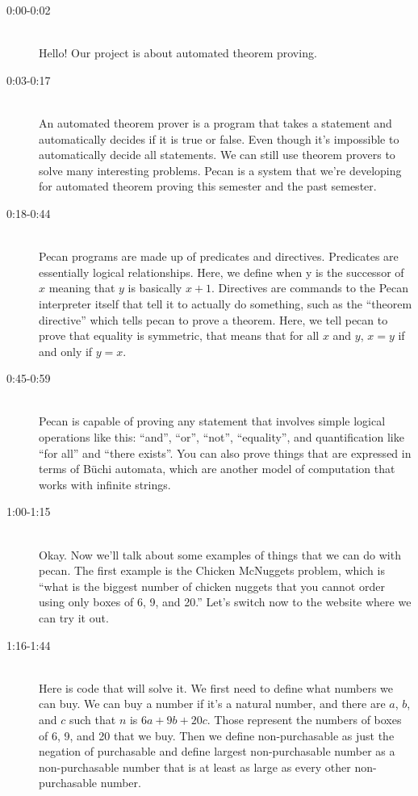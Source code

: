 \documentclass[12pt]{article}
\begin{document}
\begin{description}
\item[0:00-0:02]\hfill \\
Hello! Our project is about automated theorem proving. 


\item[0:03-0:17] \hfill \\
An automated theorem prover is a program that takes a statement and automatically decides if it is true or false. Even though it's impossible to automatically decide all statements. We can still use theorem provers to solve many interesting problems. Pecan is a system that we're developing for automated theorem proving this semester and the past semester. 

\item[0:18-0:44]\hfill \\
Pecan programs are made up of predicates and directives. Predicates are essentially logical relationships. Here, we define when y is the successor of $x$ meaning that $y$ is basically $x+1$. Directives are commands to the Pecan interpreter itself that tell it to actually do something, such as the ``theorem directive'' which tells pecan to prove a theorem. Here, we tell pecan to prove that equality is symmetric, that means that for all $x$ and $y$, $x=y$ if and only if $y=x$. 

\item[0:45-0:59]\hfill \\
Pecan is capable of proving any statement that involves simple logical operations like this: ``and'', ``or'', ``not'', ``equality'', and quantification like ``for all'' and ``there exists''. You can also prove things that are expressed in terms of B\"uchi automata, which are another model of computation that works with infinite strings.


\item[1:00-1:15]\hfill \\
Okay. Now we'll talk about some examples of things that we can do with pecan. The first example is the Chicken McNuggets problem, which is ``what is the biggest number of chicken nuggets that you cannot order using only boxes of 6, 9, and 20.'' Let's switch now to the website where we can try it out. 

\item[1:16-1:44]\hfill \\
Here is code that will solve it. We first need to define what numbers we can buy. We can buy a number if it's a natural number, and there are $a$, $b$, and $c$ such that $n$ is $6a + 9b + 20c$. Those represent the numbers of boxes of 6, 9, and 20 that we buy. Then we define non-purchasable as just the negation of purchasable and define largest non-purchasable number as a non-purchasable number that is at least as large as every other non-purchasable number. 


\end{description}
\end{document}

